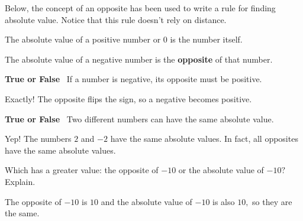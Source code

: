 \documentclass{ximera}[font=12pt]
\begin{document}
Below, the concept of an opposite has been used to write a rule for finding absolute value.  Notice that this rule 
doesn't rely on distance.

\begin{procedure}
\begin{description}[style=nextline, leftmargin=0pt, font=\bfseries]
    \item[Positive Numbers and $0$:]
    The absolute value of a positive number or $0$ is the number itself.
    \item[Negative Numbers:]
    The absolute value of a negative number is the \textbf{opposite} of that number.
\end{description}
\end{procedure}

\begin{problem}
\textcolor{orange!80!black}{\textbf{True or False}} \ If a number is negative, its opposite must be positive.

\begin{multipleChoice}
\end{multipleChoice}

\begin{feedback}[correct]
Exactly! The opposite flips the sign, so a negative becomes positive.
\end{feedback}

\end{problem}

\begin{problem}
\textcolor{orange!80!black}{\textbf{True or False}} \ Two different numbers can have the same absolute value.

\begin{multipleChoice}
\end{multipleChoice}

\begin{feedback}[correct]
Yep! The numbers $2$ and $-2$ have the same absolute values.  In fact, all opposites have the same absolute values.
\end{feedback}

\end{problem}

\begin{problem}
Which has a greater value: the opposite of $-10$ or the absolute value of $-10?$  Explain.

\begin{multipleChoice}
\end{multipleChoice}

\begin{feedback}
The opposite of $-10$ is $10$ and the absolute value of $-10$ is also $10,$ so they are the same.
\end{feedback}

\end{problem}
\end{document}
